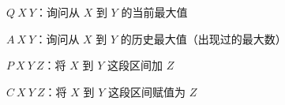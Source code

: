 $Q\ X\ Y$：询问从 $X$ 到 $Y$ 的当前最大值

$A\ X\ Y$：询问从 $X$ 到 $Y$ 的历史最大值（出现过的最大数）

$P\ X\ Y\ Z$：将 $X$ 到 $Y$ 这段区间加 $Z$

$C\ X\ Y\ Z$：将 $X$ 到 $Y$ 这段区间赋值为 $Z$

